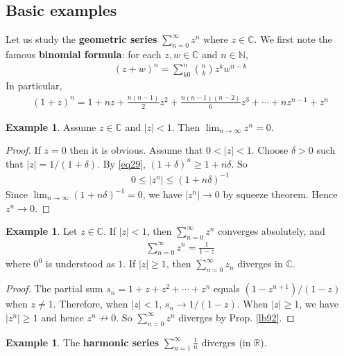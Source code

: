 \documentclass[12pt,b5paper,notitlepage]{article}
\theoremstyle{definition}
\newtheorem{eg}[df]{Example}
\theoremstyle{plain}
\newcommand{\Cbb}{\mathbb C}
\newcommand{\Nbb}{\mathbb N}
\newcommand{\Rbb}{\mathbb R}
\newcommand{\dps}{\displaystyle}
\numberwithin{equation}{section}
\begin{document}
\subsection{Basic examples}


Let us study the \textbf{geometric series} $\sum_{n=0}^\infty z^n$ where $z\in\Cbb$. We first note the famous \textbf{binomial formula}:  for each $z,w\in\Cbb$ and $n\in\Nbb$,
\begin{align}
(z+w)^n=\sum_{k0}^n{n\choose k}z^kw^{n-k}  \label{eq60}
\end{align}
In particular,
\begin{align}
(1+z)^n=1+nz+\frac{n(n-1)}{2}z^2+\frac{n(n-1)(n-2)}6 z^3+\cdots+nz^{n-1}+z^n \label{eq29}
\end{align}


\begin{eg}\label{lb110}
Assume $z\in\Cbb$ and $|z|<1$. Then $\lim_{n\rightarrow\infty}z^n=0$. 
\end{eg}

\begin{proof}
If $z=0$ then it is obvious. Assume that $0<|z|<1$. Choose $\delta>0$ such that $|z|=1/(1+\delta)$. By \eqref{eq29}, $(1+\delta)^n\geq 1+n\delta$. So
\begin{align*}
0\leq |z^n|\leq (1+n\delta)^{-1}
\end{align*}
Since $\dps\lim_{n\rightarrow\infty} (1+n\delta)^{-1}=0$, we have $|z^n|\rightarrow0$ by squeeze theorem. Hence $z^n\rightarrow0$.
\end{proof}

\begin{eg}\label{lb106}
Let $z\in\Cbb$. If $|z|<1$, then $\dps\sum_{n=0}^\infty z^n$ converges absolutely, and
\begin{align}
\sum_{n=0}^\infty z^n=\frac 1{1-z}
\end{align}
where $0^0$ is understood as $1$. If $|z|\geq 1$, then $\dps\sum_{n=0}^\infty z_n$ diverges in $\Cbb$.
\end{eg}


\begin{proof}
The partial sum $s_n=1+z+z^2+\cdots +z^n$ equals $(1-z^{n+1})/(1-z)$ when $z\neq 1$. Therefore, when $|z|<1$, $s_n\rightarrow 1/(1-z)$. When $|z|\geq 1$, we have $|z^n|\geq 1$ and hence $z^n\nrightarrow 0$. So $\sum_{n=0}^\infty z^n$ diverges by Prop. \ref{lb92}.
\end{proof}


\begin{eg}\label{lb95}
The \textbf{harmonic series} $\dps\sum_{n=1}^\infty \frac 1n$ diverges (in $\Rbb$).
\end{eg}
\end{document}
